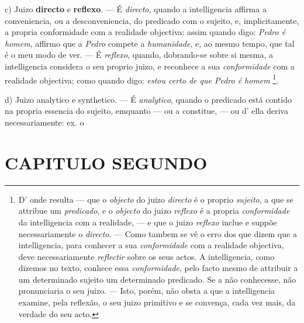 c) Juizo \textbf{directo} e \textbf{reflexo}. --- É \emph{directo}, quando a intelligencia affirma a conveniencia, ou a desconveniencia, do predicado com o sujeito, e, implicitamente, a propria conformidade com a realidade objectiva: assim quando digo: \emph{Pedro é homem}, affirmo que a \emph{Pedro} compete a \emph{humanidade}, e, ao mesmo tempo, que tal é o meu modo de ver. --- É \emph{reflexo}, quando, dobrando-se sobre si mesma, a intelligencia considera o seu proprio juizo, e reconhece a sua \emph{conformidade} com a realidade objectiva; como quando digo: \emph{estou certo de que Pedro é homem} \footnote{D' onde resulta --- que o \emph{objecto} do juizo \emph{directo} é o proprio \emph{sujeito}, a que se attribue um \emph{predicado}, e o \emph{objecto} do juizo \emph{reflexo} é a propria \emph{conformidade} da intelligencia com a realidade, --- e que o juizo \emph{reflexo} inclue e suppõe necessariamente o \emph{directo}. --- Como tambem se vê o erro dos que dizem que a intelligencia, para conhecer a sua \emph{conformidade} com a realidade objectiva, deve necessariamente \emph{reflectir} sobre os seus actos. A intelligencia, como dizemos no texto, conhece essa \emph{conformidade}, pelo facto mesmo de attribuir a um determinado sujeito um determinado predicado. Se a não conhecesse, não pronunciaria o seu juizo. --- Isto, porém, não obsta a que a intelligencia examine, pela reflexão, o seu juizo primitivo e se convença, cada vez mais, da verdade do seu acto.}.

d) Juizo analytico e synthetico. --- É \emph{analytico}, quando o predicado está contido na propria essencia do sujeito, emquanto --- ou a constitue, --- ou d' ella deriva necessariamente: ex. o


\chapter*{CAPITULO SEGUNDO}

